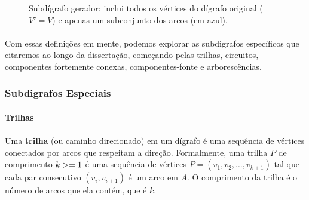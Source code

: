 \documentclass[12pt,a4paper]{article}
\def\\{}%
\def\geq{\string>=}%
\begin{document}
\begin{figure}[H]
\centering
{}
\caption{Subdígrafo gerador: inclui todos os vértices do dígrafo original ($V'=V$) e apenas um subconjunto dos arcos (em azul).}
\label{fig:subdigrafo-gerador}
\end{figure}

\paragraph{}
Com essas definições em mente, podemos explorar as subdigrafos específicos que citaremos ao longo da dissertação, começando pelas trilhas, circuitos, componentes fortemente conexas, componentes-fonte e arborescências.

\subsubsection{Subdigrafos Especiais}

\paragraph{Trilhas}

\paragraph{}
Uma \textbf{trilha} (ou caminho direcionado) em um dígrafo é uma sequência de vértices conectados por arcos que respeitam a direção. Formalmente, uma trilha \(P\) de comprimento \(k \geq 1\) é uma sequência de vértices \(P = (v_1, v_2, \ldots, v_{k+1})\) tal que cada par consecutivo \((v_i, v_{i+1})\) é um arco em \(A\). O comprimento da trilha é o número de arcos que ela contém, que é \(k\).
\end{document}
